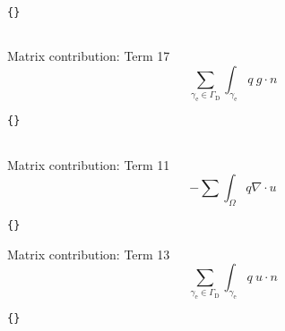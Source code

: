 \documentclass[11pt,a4paper]{article}
\begin{document}
\begin{lstlisting}{}
 
\end{lstlisting}
\newpage
Matrix contribution: Term 17\\
\begin{equation*}
\sum\limits_{\gamma_{\text{e}} \in \Gamma_{\text{D}}} \int_{\gamma_{\text{e}}} q ~ g \cdot n
\end{equation*}
\begin{lstlisting}{}
  
\end{lstlisting}
\newpage
Matrix contribution: Term 11\\
\begin{equation*}
- \sum \int_\Omega q \nabla \cdot u 
\end{equation*}
\begin{lstlisting}{}

\end{lstlisting}
\newpage
Matrix contribution: Term 13\\
\begin{equation*}
\sum\limits_{\gamma_{\text{e}} \in \Gamma_{\text{D}}} \int_{\gamma_{\text{e}}} q ~ u \cdot n
\end{equation*}
\begin{lstlisting}{}

\end{lstlisting}
\end{document}
